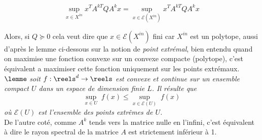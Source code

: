\begin{equation}
 \underset{x \in X^{in}}{\sup} x^{T} A^{kT} Q A^{k} x = \underset{x \in \mathcal{E} (X^{in})}{\sup} x^{T} A^{kT} Q A^{k} x
\end{equation} 

Alors, si $Q \succeq 0$ cela veut dire que $x \in \mathcal{E} (X^{in})$ fini car $X^{in}$ est un polytope, aussi d'apr\`es le lemme ci-dessous sur la notion de \textit{point extrémal},  bien entendu quand on maximise une fonction convexe sur un convexe compacte (polytope), c'est \'equivalent a maximiser cette fonction uniquement sur les points extr\'emaux. \\

$\lemme$  \textit{soit  $f: \reels^{d} \to \reels$ est convexe et continue sur un ensemble compact $U$ dans un espace de dimension finie $L$. Il résulte que
 $$\underset{x \in U} {\sup} \;f(x) \leq \underset{x \in \mathcal{E}(U)} {\sup} \; f(x)$$
où $\mathcal{E}(U)$ est l'ensemble des points extrêmes de $U$.} \\


De l'autre coté, comme $A^{k}$ tends vers la matrice nulle en l'infini, c'est équivalent à dire le rayon spectral de la matrice $A$ est strictement inférieur à 1.






